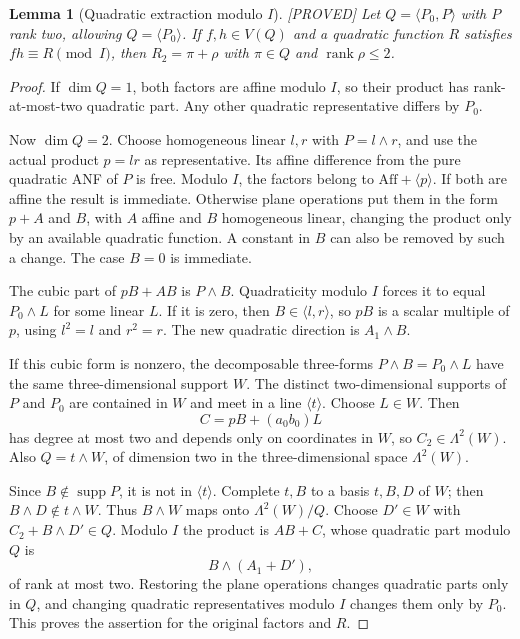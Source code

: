\documentclass[11pt,a4paper]{article}
\newtheorem{lemma}[theorem]{Lemma}
\newcommand{\Aff}{\mathrm{Aff}}
\newcommand{\rk}{\operatorname{rank}}
\newcommand{\supp}{\operatorname{supp}}
\newcommand{\status}[1]{\hfill\textsf{[#1]}}
\begin{document}
\begin{lemma}[Quadratic extraction modulo $I$]\label{lem:ideal}\status{PROVED}
Let $Q=\langle P_0,P\rangle$ with $P$ rank two, allowing $Q=\langle P_0\rangle$. If $f,h\in V(Q)$ and a quadratic function $R$ satisfies $fh\equiv R\pmod I$, then $R_2=\pi+\rho$ with $\pi\in Q$ and $\rk\rho\le2$.
\end{lemma}
\begin{proof}
If $\dim Q=1$, both factors are affine modulo $I$, so their product has rank-at-most-two quadratic part. Any other quadratic representative differs by $P_0$.

Now $\dim Q=2$. Choose homogeneous linear $l,r$ with $P=l\wedge r$, and use the actual product $p=lr$ as representative. Its affine difference from the pure quadratic ANF of $P$ is free. Modulo $I$, the factors belong to $\Aff+\langle p\rangle$. If both are affine the result is immediate. Otherwise plane operations put them in the form $p+A$ and $B$, with $A$ affine and $B$ homogeneous linear, changing the product only by an available quadratic function. A constant in $B$ can also be removed by such a change. The case $B=0$ is immediate.

The cubic part of $pB+AB$ is $P\wedge B$. Quadraticity modulo $I$ forces it to equal $P_0\wedge L$ for some linear $L$. If it is zero, then $B\in\langle l,r\rangle$, so $pB$ is a scalar multiple of $p$, using $l^2=l$ and $r^2=r$. The new quadratic direction is $A_1\wedge B$.

If this cubic form is nonzero, the decomposable three-forms $P\wedge B=P_0\wedge L$ have the same three-dimensional support $W$. The distinct two-dimensional supports of $P$ and $P_0$ are contained in $W$ and meet in a line $\langle t\rangle$. Choose $L\in W$. Then
\[
C=pB+(a_0b_0)L
\]
has degree at most two and depends only on coordinates in $W$, so $C_2\in\Lambda^2(W)$. Also $Q=t\wedge W$, of dimension two in the three-dimensional space $\Lambda^2(W)$.

Since $B\notin\supp P$, it is not in $\langle t\rangle$. Complete $t,B$ to a basis $t,B,D$ of $W$; then $B\wedge D\notin t\wedge W$. Thus $B\wedge W$ maps onto $\Lambda^2(W)/Q$. Choose $D'\in W$ with $C_2+B\wedge D'\in Q$. Modulo $I$ the product is $AB+C$, whose quadratic part modulo $Q$ is
\[
B\wedge(A_1+D'),
\]
of rank at most two. Restoring the plane operations changes quadratic parts only in $Q$, and changing quadratic representatives modulo $I$ changes them only by $P_0$. This proves the assertion for the original factors and $R$.
\end{proof}
\end{document}
